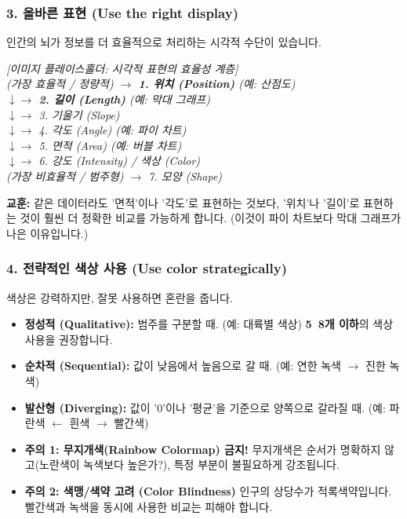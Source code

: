 \documentclass[11pt,a4paper]{book}
\theoremstyle{definition}
\begin{document}
\subsubsection{3. 올바른 표현 (Use the right display)}

인간의 뇌가 정보를 더 효율적으로 처리하는 시각적 수단이 있습니다.

\begin{center}
    \textit{[이미지 플레이스홀더: 시각적 표현의 효율성 계층]} \\
    \textit{(가장 효율적 / 정량적) $\rightarrow$ \textbf{1. 위치 (Position)} (예: 산점도)} \\
    \textit{$\downarrow \rightarrow$ \textbf{2. 길이 (Length)} (예: 막대 그래프)} \\
    \textit{$\downarrow \rightarrow$ 3. 기울기 (Slope)} \\
    \textit{$\downarrow \rightarrow$ 4. 각도 (Angle) (예: 파이 차트)} \\
    \textit{$\downarrow \rightarrow$ 5. 면적 (Area) (예: 버블 차트)} \\
    \textit{$\downarrow \rightarrow$ 6. 강도 (Intensity) / 색상 (Color)} \\
    \textit{(가장 비효율적 / 범주형) $\rightarrow$ 7. 모양 (Shape)}
\end{center}

\textbf{교훈:} 같은 데이터라도 '면적'이나 '각도'로 표현하는 것보다, '위치'나 '길이'로 표현하는 것이 훨씬 더 정확한 비교를 가능하게 합니다. (이것이 파이 차트보다 막대 그래프가 나은 이유입니다.)

\subsubsection{4. 전략적인 색상 사용 (Use color strategically)}

색상은 강력하지만, 잘못 사용하면 혼란을 줍니다.

\begin{itemize}
    \item \textbf{정성적 (Qualitative):} 범주를 구분할 때. (예: 대륙별 색상) \textbf{5~8개 이하}의 색상 사용을 권장합니다.
    \item \textbf{순차적 (Sequential):} 값이 낮음에서 높음으로 갈 때. (예: 연한 녹색 $\rightarrow$ 진한 녹색)
    \item \textbf{발산형 (Diverging):} 값이 '0'이나 '평균'을 기준으로 양쪽으로 갈라질 때. (예: 파란색 $\leftarrow$ 흰색 $\rightarrow$ 빨간색)
    \item \textbf{주의 1: 무지개색(Rainbow Colormap) 금지!} 무지개색은 순서가 명확하지 않고(노란색이 녹색보다 높은가?), 특정 부분이 불필요하게 강조됩니다.
    \item \textbf{주의 2: 색맹/색약 고려 (Color Blindness)} 인구의 상당수가 적록색약입니다. 빨간색과 녹색을 동시에 사용한 비교는 피해야 합니다.
\end{itemize}
\end{document}
